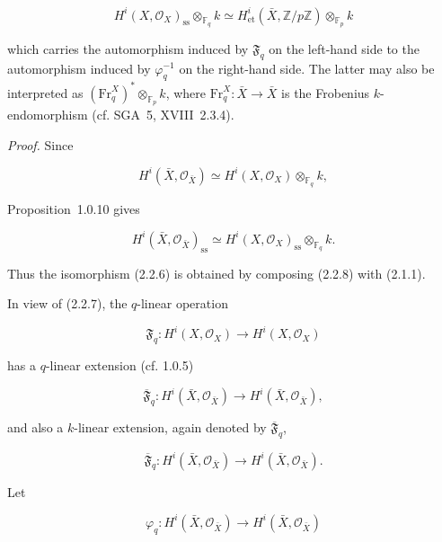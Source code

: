 \begin{equation}\tag{2.2.6}
H^i(X,\mathcal O_X)_{\mathrm{ss}}\otimes_{\mathbb F_q}k
\simeq
H^i_{\mathrm{et}}(\bar X,\mathbb Z/p\mathbb Z)
\otimes_{\mathbb F_p}k
\end{equation}

which carries the automorphism induced by $\mathfrak F_q$ on the left-hand
side to the automorphism induced by $\varphi_q^{-1}$ on the right-hand side.
The latter may also be interpreted as
$(\mathrm{Fr}_q^X)^*\otimes_{\mathbb F_p}k$, where
$\mathrm{Fr}_q^X:\bar X\longrightarrow\bar X$ is the Frobenius
$k$-endomorphism (cf. SGA~5, XVIII~2.3.4).

\medskip
\noindent\emph{Proof.}
Since

\begin{equation}\tag{2.2.7}
H^i(\bar X,\mathcal O_{\bar X})\simeq
H^i(X,\mathcal O_X)\otimes_{\mathbb F_q}k,
\end{equation}

Proposition~1.0.10 gives

\begin{equation}\tag{2.2.8}
H^i(\bar X,\mathcal O_{\bar X})_{\mathrm{ss}}\simeq
H^i(X,\mathcal O_X)_{\mathrm{ss}}\otimes_{\mathbb F_q}k.
\end{equation}

Thus the isomorphism (2.2.6) is obtained by composing (2.2.8) with
(2.1.1).

In view of (2.2.7), the $q$-linear operation

\begin{equation}\tag{2.2.9}
\mathfrak F_q:H^i(X,\mathcal O_X)\longrightarrow H^i(X,\mathcal O_X)
\end{equation}

has a $q$-linear extension (cf. 1.0.5)

\begin{equation}\tag{2.2.10}
\overline{\mathfrak F}_q:H^i(\bar X,\mathcal O_{\bar X})
\longrightarrow H^i(\bar X,\mathcal O_{\bar X}),
\end{equation}

and also a $k$-linear extension, again denoted by
$\overline{\mathfrak F}_q$,

\begin{equation}\tag{2.2.11}
\overline{\mathfrak F}_q:H^i(\bar X,\mathcal O_{\bar X})
\longrightarrow H^i(\bar X,\mathcal O_{\bar X}).
\end{equation}

Let

\begin{equation}\tag{2.2.12}
\varphi_q:H^i(\bar X,\mathcal O_{\bar X})
\longrightarrow H^i(\bar X,\mathcal O_{\bar X})
\end{equation}

